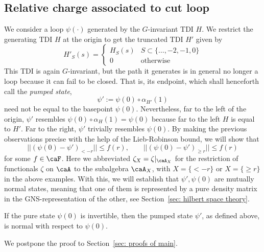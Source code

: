 \subsection{Relative charge associated to cut loop}\label{sec: relative charge for cut loop}


We consider a loop $\psi(\cdot)$ generated by the $G$-invariant TDI $H$. 
We restrict the generating TDI $H$ at the origin to get the truncated TDI $H'$ given by
\begin{equation}\label{eq: tdi cut loop}
	H'_{S}(s)= \begin{cases}   H_S(s)  &  S \subset \{\ldots,-2, -1,0\} \\  0 & \text{otherwise} \end{cases}  
\end{equation}
This TDI is again $G$-invariant, but the path it generates is in general no longer a loop because it can fail to be closed. That is, its endpoint, which shall henceforth call the \emph{pumped state},
$$
\psi':=  \psi(0) \circ \alpha_{H'}(1) 
$$
need not be equal to the basepoint $\psi(0)$.  Nevertheless, far to the left of the origin,  $\psi'$ resembles $\psi(0) \circ \alpha_{H}(1)=\psi(0)$ because far to the left $H$ is equal to $H'$. Far to the right,  $\psi'$ trivially resembles $\psi(0)$. By making the previous observations precise with the help of the Lieb-Robinson bound, we will show that
\begin{equation}\label{eq: same away from cut}
	||(\psi(0)-\psi')_{< -r} || \leq f(r),\qquad  ||(\psi(0)-\psi')_{{\geq r}} || \leq f(r)
\end{equation}
for some $f\in \caF$. Here we abbreviated $\zeta_X=\zeta|_{\caA_X}$ for the restriction of functionals $\zeta$ on $\caA$ to the subalgebra $\caA_X$, with $X=\{{< -r}\}$ or $X=\{{\geq r}\}$ in the above examples. With this, we will establish  that $\psi',\psi(0)$ are mutually normal states, meaning that one of them is represented by a pure density matrix in the GNS-representation of the other, see Section~\ref{sec: hilbert space theory}. 
\begin{proposition}\label{prop: equivalence of states}
	If the pure state $\psi(0)$ is invertible, then the pumped state $\psi'$, as defined above, is normal with respect to $\psi(0)$.
\end{proposition}
\noindent We postpone the proof to Section~\ref{sec: proofs of main}. 

